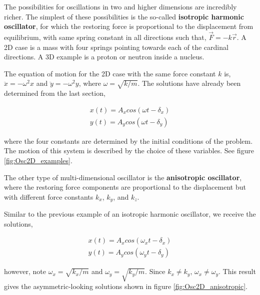 
The possibilities for oscillations in two and higher dimensions are incredibly richer. The simplest of these possibilities is the so-called {\bfseries isotropic harmonic oscillator}, for which the restoring force is proportional to the displacement from equilibrium, with same spring constant in all directions such that, $\vec{F} = -k\vec{r}$. A 2D case is a mass with four springs pointing towards each of the cardinal directions. A 3D example is a proton or neutron inside a nucleus.

The equation of motion for the 2D case with the same force constant $k$ is, $\ddot{x} = -\omega^2x$ and $\ddot{y} = -\omega^2y$, where $\omega = \sqrt{k/m}$. The solutions have already been determined from the last section,

\begin{gather*}
    x(t) = A_x cos(\omega t - \delta_x) \\
    y(t) = A_y cos(\omega t - \delta_y) 
\end{gather*}

\noindent where the four constants are determined by the initial conditions of the problem. The motion of this system is described by the choice of these variables. See figure \ref{fig:Osc2D_examples}.

The other type of multi-dimensional oscillator is the {\bfseries anisotropic oscillator}, where the restoring force components are proportional to the displacement but with different force constants $k_x$, $k_y$, and $k_z$.

Similar to the previous example of an isotropic harmonic oscillator, we receive the solutions,

\begin{gather*}
    x(t) = A_x cos(\omega_x t - \delta_x) \\
    y(t) = A_y cos(\omega_y t - \delta_y) 
\end{gather*}

\noindent however, note $\omega_x = \sqrt{k_x/m}$ and $\omega_y = \sqrt{k_y/m}$. Since $k_x \neq k_y$, $\omega_x \neq \omega_y$. This result gives the asymmetric-looking solutions shown in figure \ref{fig:Osc2D_anisotropic}.

